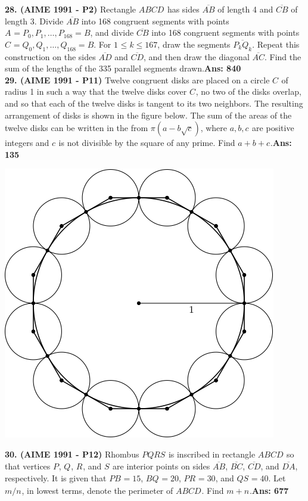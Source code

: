 \documentclass[letterpaper,10pt,addpoints]{exam}
\begin{document}
\textbf{28. (AIME 1991 - P2) }Rectangle $ABCD_{}^{}$ has sides $\overline {AB}$ of length 4 and $\overline {CB}$ of length 3. Divide $\overline {AB}$ into 168 congruent segments with points $A_{}^{}=P_0, P_1, \ldots, P_{168}=B$, and divide $\overline {CB}$ into 168 congruent segments with points $C_{}^{}=Q_0, Q_1, \ldots, Q_{168}=B$. For $1_{}^{} \le k \le 167$, draw the segments $\overline {P_kQ_k}$. Repeat this construction on the sides $\overline {AD}$ and $\overline {CD}$, and then draw the diagonal $\overline {AC}$. Find the sum of the lengths of the 335 parallel segments drawn.\quad  \textbf{Ans: 840}\\

\textbf{29. (AIME 1991 - P11) }Twelve congruent disks are placed on a circle $C^{}_{}$ of radius 1 in such a way that the twelve disks cover $C^{}_{}$, no two of the disks overlap, and so that each of the twelve disks is tangent to its two neighbors. The resulting arrangement of disks is shown in the figure below. The sum of the areas of the twelve disks can be written in the from $\pi(a-b\sqrt{c})$, where $a,b,c^{}_{}$ are positive integers and $c^{}_{}$ is not divisible by the square of any prime. Find $a+b+c^{}_{}$.\quad  \textbf{Ans: 135}

\begin{center}
\includegraphics[scale=0.6]{AIME_1991_Problem_11.png}
\end{center}

\textbf{30. (AIME 1991 - P12) }Rhombus $PQRS^{}_{}$ is inscribed in rectangle $ABCD^{}_{}$ so that vertices $P^{}_{}$, $Q^{}_{}$, $R^{}_{}$, and $S^{}_{}$ are interior points on sides $\overline{AB}$, $\overline{BC}$, $\overline{CD}$, and $\overline{DA}$, respectively. It is given that $PB^{}_{}=15$, $BQ^{}_{}=20$, $PR^{}_{}=30$, and $QS^{}_{}=40$. Let $m/n^{}_{}$, in lowest terms, denote the perimeter of $ABCD^{}_{}$. Find $m+n^{}_{}$.\textbf{Ans: 677}\\
\end{document}
